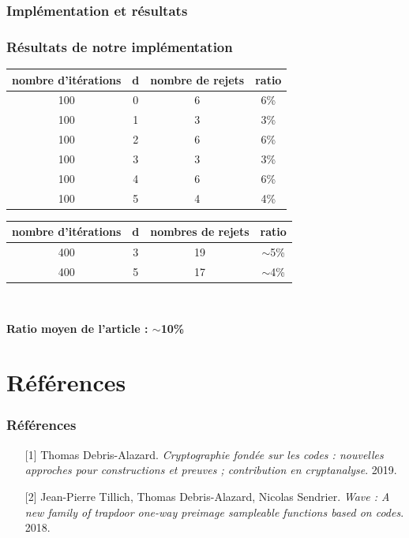 \documentclass[10pt,a4paper]{beamer}
\theoremstyle{plain}
\theoremstyle{definition}
\begin{document}
\begin{frame}
\frametitle{Implémentation et résultats}
\frametitle{Résultats de notre implémentation}
\begin{center}
\begin{tabular}{|c|c|c|c|} 
\hline
\textbf{nombre d'itérations} & \textbf{d} & \textbf{nombre de rejets} & \textbf{ratio\;} \\\hline 
100 & 0 & 6 & 6\% \\\hline
100 & 1 & 3 & 3\% \\\hline 
100 & 2 & 6 & 6\% \\\hline
100 & 3 & 3 & 3\% \\\hline
100 & 4 & 6 & 6\% \\\hline
100 & 5 & 4 & 4\% \\\hline
\end{tabular}
\end{center}
\begin{center}
\begin{tabular}{|c|c|c|c|} 
\hline
\textbf{nombre d'itérations} & \textbf{d} & \textbf{nombres de rejets} & \textbf{ratio} \\\hline 
400 & 3 & 19 & $\sim$5\% \\\hline
400 & 5 & 17 & $\sim$4\%\\\hline 
\end{tabular}\

\vspace{0.2in}
\textbf{Ratio moyen de l'article : $\sim$10\%}
\end{center}
\end{frame}


\section*{Références}




\begin{frame}
  \frametitle{Références}
  \begin{enumerate}
  \item[{[1]}] Thomas Debris-Alazard. \textit{Cryptographie fondée sur les codes : nouvelles approches pour constructions et preuves ; contribution en cryptanalyse}. 2019.
  \vspace{0.1in}
  \item[{[2]}] Jean-Pierre Tillich, Thomas Debris-Alazard, Nicolas Sendrier. \textit{Wave : A
new family of trapdoor one-way preimage sampleable functions based on codes}. 2018.
  \end{enumerate}
\end{frame}
\end{document}
